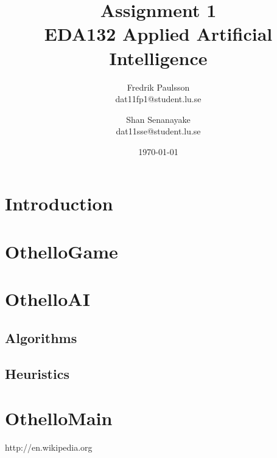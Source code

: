 \documentclass[a4paper]{article}
\title{Assignment 1 \\ EDA132 Applied Artificial Intelligence}
\date{\today}
\author{Fredrik Paulsson \\ dat11fp1@student.lu.se \and Shan Senanayake \\ dat11sse@student.lu.se}
\begin{document}
\maketitle


\section{Introduction}

\section{OthelloGame}

\section{OthelloAI}

\subsection{Algorithms}

\subsection{Heuristics}

\section{OthelloMain}


\begin{thebibliography}{1}
http://en.wikipedia.org
\end{thebibliography}
\end{document}

